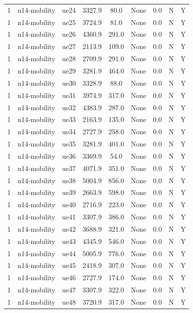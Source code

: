 \begin{table}[ht]
\begin{tabular}{|c|c|c|c|c|c|c|c|c|}
1 & n14-mobility & ue24 & 3327.9 & 80.0 & None & 0.0 & N & Y \\
1 & n14-mobility & ue25 & 3724.9 & 81.0 & None & 0.0 & N & Y \\
1 & n14-mobility & ue26 & 4360.9 & 291.0 & None & 0.0 & N & Y \\
1 & n14-mobility & ue27 & 2113.9 & 109.0 & None & 0.0 & N & Y \\
1 & n14-mobility & ue28 & 2709.9 & 291.0 & None & 0.0 & N & Y \\
1 & n14-mobility & ue29 & 3281.9 & 464.0 & None & 0.0 & N & Y \\
1 & n14-mobility & ue30 & 3328.9 & 88.0 & None & 0.0 & N & Y \\
1 & n14-mobility & ue31 & 3974.9 & 317.0 & None & 0.0 & N & Y \\
1 & n14-mobility & ue32 & 4383.9 & 287.0 & None & 0.0 & N & Y \\
1 & n14-mobility & ue33 & 2163.9 & 135.0 & None & 0.0 & N & Y \\
1 & n14-mobility & ue34 & 2727.9 & 258.0 & None & 0.0 & N & Y \\
1 & n14-mobility & ue35 & 3281.9 & 401.0 & None & 0.0 & N & Y \\
1 & n14-mobility & ue36 & 3369.9 & 54.0 & None & 0.0 & N & Y \\
1 & n14-mobility & ue37 & 4071.9 & 351.0 & None & 0.0 & N & Y \\
1 & n14-mobility & ue38 & 5004.9 & 856.0 & None & 0.0 & N & Y \\
1 & n14-mobility & ue39 & 2663.9 & 598.0 & None & 0.0 & N & Y \\
1 & n14-mobility & ue40 & 2716.9 & 223.0 & None & 0.0 & N & Y \\
1 & n14-mobility & ue41 & 3307.9 & 386.0 & None & 0.0 & N & Y \\
1 & n14-mobility & ue42 & 3688.9 & 321.0 & None & 0.0 & N & Y \\
1 & n14-mobility & ue43 & 4345.9 & 546.0 & None & 0.0 & N & Y \\
1 & n14-mobility & ue44 & 5005.9 & 776.0 & None & 0.0 & N & Y \\
1 & n14-mobility & ue45 & 2418.9 & 307.0 & None & 0.0 & N & Y \\
1 & n14-mobility & ue46 & 2727.9 & 174.0 & None & 0.0 & N & Y \\
1 & n14-mobility & ue47 & 3307.9 & 322.0 & None & 0.0 & N & Y \\
1 & n14-mobility & ue48 & 3720.9 & 317.0 & None & 0.0 & N & Y \\

\end{tabular}
\end{table}
